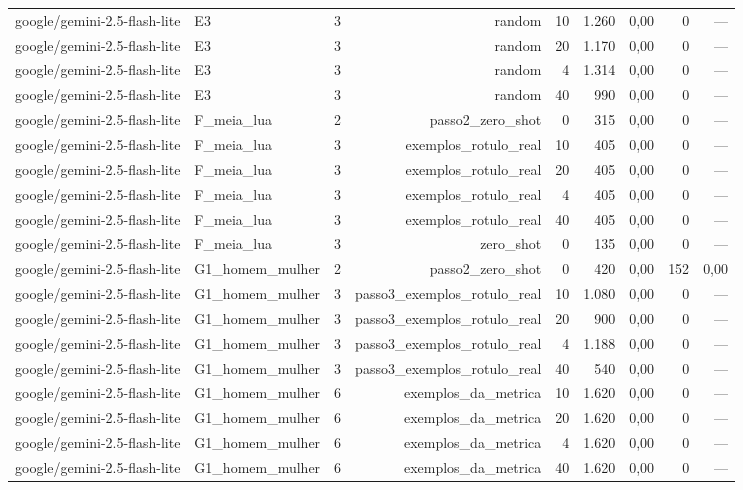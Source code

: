 \begin{table}[htbp]
\begin{tabular}{lllrrrrrr}
google/gemini-2.5-flash-lite & E3 & 3 & random & 10 & 1.260 & 0,00 & 0 & — \\
google/gemini-2.5-flash-lite & E3 & 3 & random & 20 & 1.170 & 0,00 & 0 & — \\
google/gemini-2.5-flash-lite & E3 & 3 & random & 4 & 1.314 & 0,00 & 0 & — \\
google/gemini-2.5-flash-lite & E3 & 3 & random & 40 & 990 & 0,00 & 0 & — \\
google/gemini-2.5-flash-lite & F\_meia\_lua & 2 & passo2\_zero\_shot & 0 & 315 & 0,00 & 0 & — \\
google/gemini-2.5-flash-lite & F\_meia\_lua & 3 & exemplos\_rotulo\_real & 10 & 405 & 0,00 & 0 & — \\
google/gemini-2.5-flash-lite & F\_meia\_lua & 3 & exemplos\_rotulo\_real & 20 & 405 & 0,00 & 0 & — \\
google/gemini-2.5-flash-lite & F\_meia\_lua & 3 & exemplos\_rotulo\_real & 4 & 405 & 0,00 & 0 & — \\
google/gemini-2.5-flash-lite & F\_meia\_lua & 3 & exemplos\_rotulo\_real & 40 & 405 & 0,00 & 0 & — \\
google/gemini-2.5-flash-lite & F\_meia\_lua & 3 & zero\_shot & 0 & 135 & 0,00 & 0 & — \\
google/gemini-2.5-flash-lite & G1\_homem\_mulher & 2 & passo2\_zero\_shot & 0 & 420 & 0,00 & 152 & 0,00 \\
google/gemini-2.5-flash-lite & G1\_homem\_mulher & 3 & passo3\_exemplos\_rotulo\_real & 10 & 1.080 & 0,00 & 0 & — \\
google/gemini-2.5-flash-lite & G1\_homem\_mulher & 3 & passo3\_exemplos\_rotulo\_real & 20 & 900 & 0,00 & 0 & — \\
google/gemini-2.5-flash-lite & G1\_homem\_mulher & 3 & passo3\_exemplos\_rotulo\_real & 4 & 1.188 & 0,00 & 0 & — \\
google/gemini-2.5-flash-lite & G1\_homem\_mulher & 3 & passo3\_exemplos\_rotulo\_real & 40 & 540 & 0,00 & 0 & — \\
google/gemini-2.5-flash-lite & G1\_homem\_mulher & 6 & exemplos\_da\_metrica & 10 & 1.620 & 0,00 & 0 & — \\
google/gemini-2.5-flash-lite & G1\_homem\_mulher & 6 & exemplos\_da\_metrica & 20 & 1.620 & 0,00 & 0 & — \\
google/gemini-2.5-flash-lite & G1\_homem\_mulher & 6 & exemplos\_da\_metrica & 4 & 1.620 & 0,00 & 0 & — \\
google/gemini-2.5-flash-lite & G1\_homem\_mulher & 6 & exemplos\_da\_metrica & 40 & 1.620 & 0,00 & 0 & — \\

\end{tabular}
\end{table}
